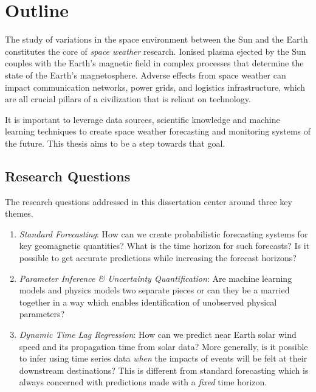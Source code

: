 \chapter{Outline}\label{chapter:Outline}

The study of variations in the space environment between the Sun and the Earth constitutes 
the core of \textit{space weather} research. Ionised plasma ejected by the Sun couples with 
the Earth’s magnetic field in complex processes that determine the state of the Earth's 
magnetosphere. Adverse effects from space weather can impact communication networks, 
power grids, and logistics infrastructure, which are all crucial pillars of a civilization that 
is reliant on technology.

It is important to leverage data sources, scientific knowledge and machine learning 
techniques to create space weather forecasting and monitoring systems of the future. This 
thesis aims to be a step towards that goal. 

\section{Research Questions}

The research questions addressed in this dissertation center around three key themes.

\begin{enumerate}
    \item \textit{Standard Forecasting}: How can we create probabilistic forecasting systems 
    for key geomagnetic quantities? What is the time horizon for such forecasts? Is it possible 
    to get accurate predictions while increasing the forecast horizons?
    
    \item \textit{Parameter Inference \& Uncertainty Quantification}: Are machine learning models 
    and physics models two separate pieces or can they be a married together in a way which enables 
    identification of unobserved physical parameters?  
    
    \item \textit{Dynamic Time Lag Regression}: How can we predict near Earth solar wind speed 
    and its propagation time from solar data? More generally, is it possible to infer using time 
    series data \emph{when} the impacts of events will be felt at their downstream destinations? 
    This is different from standard forecasting which is always concerned with predictions made 
    with a \emph{fixed} time horizon.
\end{enumerate}
    
